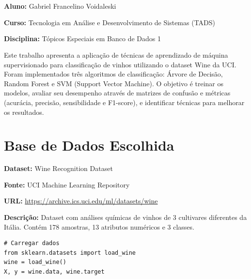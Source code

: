 \documentclass[12pt,a4paper]{article}
\begin{document}
\section{}

\textbf{Aluno:} Gabriel Francelino Voidaleski

\textbf{Curso:} Tecnologia em Análise e Desenvolvimento de Sistemas (TADS)

\textbf{Disciplina:} Tópicos Especiais em Banco de Dados 1

\vspace{0.5cm}

Este trabalho apresenta a aplicação de técnicas de aprendizado de máquina supervisionado para classificação de vinhos utilizando o dataset Wine da UCI. Foram implementados três algoritmos de classificação: Árvore de Decisão, Random Forest e SVM (Support Vector Machine). O objetivo é treinar os modelos, avaliar seu desempenho através de matrizes de confusão e métricas (acurácia, precisão, sensibilidade e F1-score), e identificar técnicas para melhorar os resultados.

\section{Base de Dados Escolhida}

\textbf{Dataset:} Wine Recognition Dataset

\textbf{Fonte:} UCI Machine Learning Repository

\textbf{URL:} \url{https://archive.ics.uci.edu/ml/datasets/wine}

\textbf{Descrição:} Dataset com análises químicas de vinhos de 3 cultivares diferentes da Itália. Contém 178 amostras, 13 atributos numéricos e 3 classes.

\begin{lstlisting}
# Carregar dados
from sklearn.datasets import load_wine
wine = load_wine()
X, y = wine.data, wine.target
\end{lstlisting}

\end{document}
